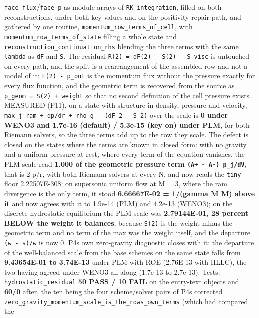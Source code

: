 \documentclass[english,a4paper]{my_memo}
\begin{document}
\begin{itemize}
  \texttt{face\_flux}/\texttt{face\_p} as module arrays of \texttt{RK\_integration}, filled on both
  reconstructions, under both key values and on the positivity-repair path,
  and gathered by one routine, \texttt{momentum\_row\_terms\_of\_cell}, with
  \texttt{momentum\_row\_terms\_of\_state} filling a whole state and
  \texttt{reconstruction\_continuation\_rhs} blending the three terms with the same
  \texttt{lambda} as \texttt{dF} and \texttt{S}. The residual \texttt{R(2)\ =\ dF(2)\ -\ S(2)\ -\ S\_visc} is
  untouched on every path, and the split is a rearrangement of the assembled
  row and not a model of it: \texttt{F(2)\ -\ p\_out} is the momentum flux without the
  pressure exactly for every flux function, and the geometric term is
  recovered from the source as \texttt{p\_geom\ =\ S(2)\ +\ weight} so that no second
  definition of the cell pressure exists. MEASURED (P11), on a state with
  structure in density, pressure and velocity,
  \texttt{max\_j\ \textbar{}ram\ +\ dp/dr\ +\ rho\ g\ -\ (dF\_2\ -\ S\_2)\textbar{}} over the scale is \textbf{0 under
  WENO3 and 1.7e-16 (default) / 5.3e-15 (key on) under PLM}, for both Riemann
  solvers, so the three terms add up to the row they scale. The defect is
  closed on the states where the terms are known in closed form: with no
  gravity and a uniform pressure at rest, where every term of the equation
  vanishes, the PLM scale read \textbf{1.000 of the geometric pressure term
  \texttt{(A+\ -\ A-)\ p\_j/dV}}, that is 2 p/r, with both Riemann solvers at every N,
  and now reads the \texttt{tiny} floor 2.22507E-308; on supersonic uniform flow at
  M = 3, where the ram divergence is the only term, it stood \textbf{6.66667E-02 =
  1/(gamma M M) above it} and now agrees with it to 1.9e-14 (PLM) and
  4.2e-13 (WENO3); on the discrete hydrostatic equilibrium the PLM scale was
  \textbf{2.79144E-01, 28 percent BELOW the weight it balances}, because \texttt{S(2)} is
  the weight minus the geometric term and no term of the max was the weight
  itself, and the departure \texttt{(w\ -\ s)/w} is now 0. P4\textquotesingle s own zero-gravity
  diagnostic closes with it: the departure of the well-balanced scale from the
  base scheme\textquotesingle s on the same state falls from \textbf{9.43654E-01 to 3.74E-13} under
  PLM with ROE (2.76E-13 with HLLC), the two having agreed under WENO3 all
  along (1.7e-13 to 2.7e-13). Tests: \texttt{hydrostatic\_residual} \textbf{50 PASS / 10
  FAIL} on the entry-text objects and \textbf{60/0} after, the ten being the four
  scheme/solver pairs of P4\textquotesingle s corrected
  \texttt{zero\_gravity\_momentum\_scale\_is\_the\_rows\_own\_terms} (which had compared the

\end{itemize}
\end{document}
